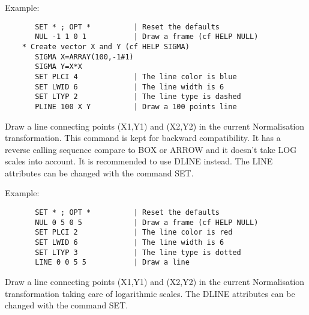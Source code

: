    \par
Example:  
\begin{verbatim}
       SET * ; OPT *          | Reset the defaults
       NUL -1 1 0 1           | Draw a frame (cf HELP NULL)
    * Create vector X and Y (cf HELP SIGMA)
       SIGMA X=ARRAY(100,-1#1)
       SIGMA Y=X*X
       SET PLCI 4             | The line color is blue
       SET LWID 6             | The line width is 6
       SET LTYP 2             | The line type is dashed
       PLINE 100 X Y          | Draw a 100 points line
\end{verbatim}

\ENDCMD


\BEGARG
{}
\ENDARG

   \par
Draw a line connecting points (X1,Y1) and (X2,Y2) in the current 
   Normalisation transformation. This command is kept for backward 
   compatibility. It has a reverse calling sequence compare to BOX or ARROW 
   and it doesn't take LOG scales into account. It is recommended to use DLINE 
   instead. The LINE attributes can be changed with the command SET.  

   \par
Example:  
\begin{verbatim}
       SET * ; OPT *          | Reset the defaults
       NUL 0 5 0 5            | Draw a frame (cf HELP NULL)
       SET PLCI 2             | The line color is red
       SET LWID 6             | The line width is 6
       SET LTYP 3             | The line type is dotted
       LINE 0 0 5 5           | Draw a line
\end{verbatim}

\ENDCMD


\BEGARG
{}
\ENDARG

   \par
Draw a line connecting points (X1,Y1) and (X2,Y2) in the current 
   Normalisation transformation taking care of logarithmic scales. The DLINE 
   attributes can be changed with the command SET.  

